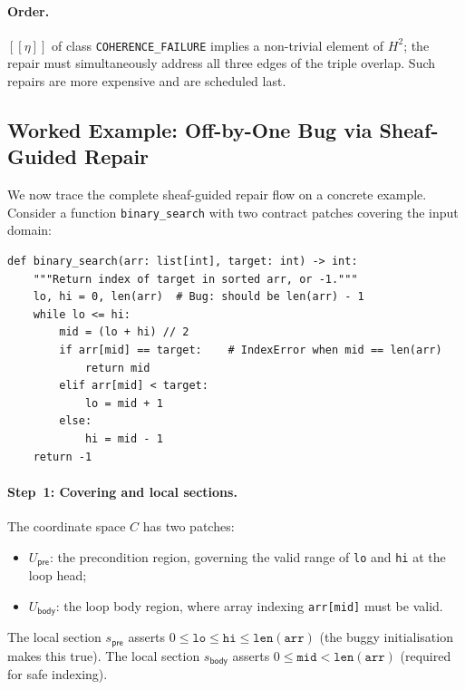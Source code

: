 \documentclass[11pt]{article}
\newcommand{\cls}[1]{[\![#1]\!]}            %
\begin{document}
\paragraph{Order.}
$\cls{\eta}$ of class \texttt{COHERENCE\_FAILURE} implies a non-trivial
element of $H^2$; the repair must simultaneously address all three edges of
the triple overlap.  Such repairs are more expensive and are scheduled last.

\subsection{Worked Example: Off-by-One Bug via Sheaf-Guided Repair}
\label{subsec:worked-example}

We now trace the complete sheaf-guided repair flow on a concrete example.
Consider a function \texttt{binary\_search} with two contract patches
covering the input domain:

\begin{lstlisting}[style=jugeo-python,caption={Buggy binary search with off-by-one error.}]
def binary_search(arr: list[int], target: int) -> int:
    """Return index of target in sorted arr, or -1."""
    lo, hi = 0, len(arr)  # Bug: should be len(arr) - 1
    while lo <= hi:
        mid = (lo + hi) // 2
        if arr[mid] == target:    # IndexError when mid == len(arr)
            return mid
        elif arr[mid] < target:
            lo = mid + 1
        else:
            hi = mid - 1
    return -1
\end{lstlisting}

\paragraph{Step~1: Covering and local sections.}
The coordinate space $C$ has two patches:
\begin{itemize}
  \item $U_{\mathsf{pre}}$: the precondition region, governing the valid
        range of \texttt{lo} and \texttt{hi} at the loop head;
  \item $U_{\mathsf{body}}$: the loop body region, where array indexing
        \texttt{arr[mid]} must be valid.
\end{itemize}
The local section $s_{\mathsf{pre}}$ asserts $0 \leq \mathtt{lo} \leq
\mathtt{hi} \leq \mathtt{len(arr)}$ (the buggy initialisation makes this
true).  The local section $s_{\mathsf{body}}$ asserts $0 \leq \mathtt{mid}
< \mathtt{len(arr)}$ (required for safe indexing).
\end{document}
